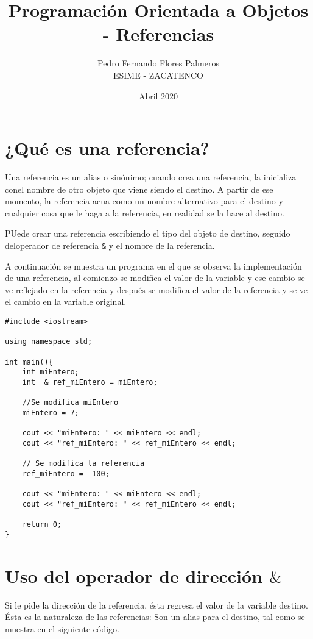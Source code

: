 \documentclass[12pt]{extarticle}
\title{Programación Orientada a Objetos - Referencias}
\author{Pedro Fernando Flores Palmeros \\ ESIME - ZACATENCO}
\date{Abril 2020}
\newcommand{\<}{\langle}
\renewcommand{\>}{\rangle}
\theoremstyle{definition}
\begin{document}
\maketitle



\section{¿Qué es una referencia?}
Una referencia es un alias o sinónimo; cuando crea una referencia, la inicializa conel nombre de otro objeto que viene siendo el destino. A partir de ese momento, la referencia acua como un nombre alternativo para el destino y cualquier cosa que le haga a la referencia, en realidad se la hace al destino. 

PUede crear una referencia escribiendo el tipo del objeto de destino, seguido deloperador de referencia \verb|&| y el nombre de la referencia.


A continuación se muestra un programa en el que se observa la implementación de una referencia, al comienzo se modifica el valor de la variable y ese cambio se ve reflejado en la referencia y después se modifica el valor de la referencia y se ve el cambio en la variable original.


\begin{lstlisting}
#include <iostream>

using namespace std;

int main(){
	int miEntero;
	int  & ref_miEntero = miEntero;
	
	//Se modifica miEntero
	miEntero = 7;
	
	cout << "miEntero: " << miEntero << endl; 
	cout << "ref_miEntero: " << ref_miEntero << endl; 
	
	// Se modifica la referencia
	ref_miEntero = -100;
	
	cout << "miEntero: " << miEntero << endl; 
	cout << "ref_miEntero: " << ref_miEntero << endl; 
	
	return 0;
}
\end{lstlisting}


\section{Uso del operador de dirección $\&$}

Si le pide la dirección de la referencia, ésta regresa el valor de la variable destino. Ésta es la naturaleza de las referencias: Son un alias para el destino, tal como se muestra en el siguiente código. 
\end{document}
